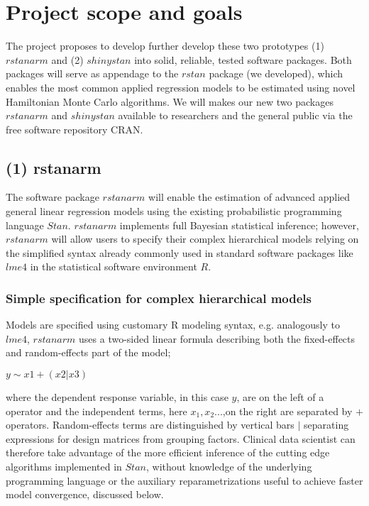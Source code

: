 \documentclass[11pt,notitlepage]{article}
\begin{document}
\section*{Project scope and goals }
The project proposes to develop further develop these two prototypes (1) $rstanarm$ and (2) $shinystan$ into solid, reliable, tested software packages. Both packages will serve as appendage to the $rstan$ package (we developed), which enables the most common applied regression models to be estimated using novel Hamiltonian Monte Carlo algorithms. We will makes our new two packages $rstanarm$ and $shinystan$ available to researchers and the general public via the free software repository CRAN. 

\subsection*{(1) rstanarm}
The software package $rstanarm$ will enable the estimation of advanced applied general linear regression models using the existing probabilistic programming language $Stan$. $rstanarm$ implements full Bayesian statistical inference;  however, $rstanarm$ will allow users to specify their complex hierarchical models relying on the simplified syntax already commonly used in standard software packages like $lme4$ in the statistical software environment $R$. 

\subsubsection*{Simple specification for complex hierarchical models}

Models are specified using customary R modeling syntax, e.g. analogously to $lme4$, $rstanarm$ uses a two-sided linear formula describing both the fixed-effects and random-effects part of the model; 

$y \sim x1 +(x2|x3)$ 

where the dependent response variable, in this case $y$, are on the left of a $~$ operator and the independent terms, here $x_1, x_2...$,on the right  are separated by $+$ operators. Random-effects terms are distinguished by vertical bars $|$ separating expressions for design matrices from grouping factors. Clinical data scientist can therefore take advantage of the  more efficient inference of the cutting edge algorithms implemented in $Stan$, without knowledge of the underlying programming language or the auxiliary reparametrizations useful to achieve faster model convergence, discussed below.
\end{document}
